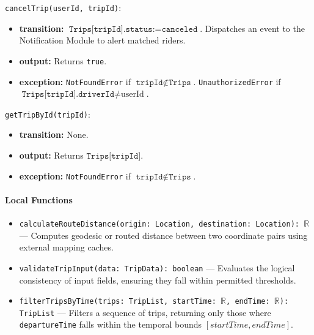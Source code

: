 \noindent \texttt{cancelTrip(userId, tripId)}:
\begin{itemize}
    \item \textbf{transition:} $\texttt{Trips[tripId].status} := \texttt{canceled}$. Dispatches an event to the Notification Module to alert matched riders.
    \item \textbf{output:} Returns \texttt{true}.
    \item \textbf{exception:} \texttt{NotFoundError} if $\texttt{tripId} \notin \texttt{Trips}$. \texttt{UnauthorizedError} if $\texttt{Trips[tripId].driverId} \neq \text{userId}$.
\end{itemize}

\noindent \texttt{getTripById(tripId)}:
\begin{itemize}
    \item \textbf{transition:} None.
    \item \textbf{output:} Returns $\texttt{Trips[tripId]}$.
    \item \textbf{exception:} \texttt{NotFoundError} if $\texttt{tripId} \notin \texttt{Trips}$.
\end{itemize}

\paragraph{Local Functions}
\begin{itemize}
    \item \texttt{calculateRouteDistance(origin: Location, destination: Location): $\mathbb{R}$} --- Computes geodesic or routed distance between two coordinate pairs using external mapping caches.
    \item \texttt{validateTripInput(data: TripData): boolean} --- Evaluates the logical consistency of input fields, ensuring they fall within permitted thresholds.
    \item \texttt{filterTripsByTime(trips: TripList, startTime: $\mathbb{R}$, endTime: $\mathbb{R}$): TripList} --- Filters a sequence of trips, returning only those where \texttt{departureTime} falls within the temporal bounds $[startTime, endTime]$.
\end{itemize}